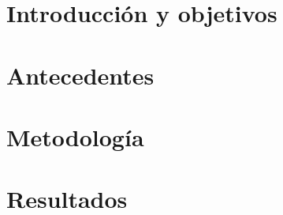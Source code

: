 \documentclass[12pt,dvipsnames,a4paper,twoside]{article}
\begin{document}


% 


\newpage
\section{Introducción y objetivos}




\newpage
\section{Antecedentes}



\newpage
\section{Metodología}




\newpage
\section{Resultados}
\end{document}
